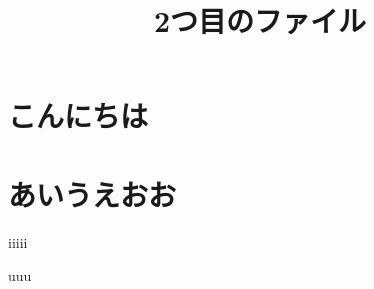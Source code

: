 \documentclass[a4j,epsf,twocolumn]{jarticle}
\title{2つ目のファイル}
\begin{document}
    \section{こんにちは}

    \section{あいうえおお}
        iiiii

    \begin{thebibliography}{99}
         uuu
    \end{thebibliography}
\end{document}
